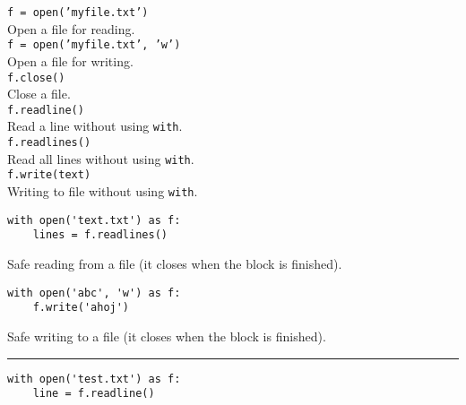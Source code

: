 \documentclass[12pt,a4paper]{article}
\begin{document}
\pagestyle{empty}

\setlength\parindent{0pt}
\setlength{\columnsep}{60pt}

\begin{multicols}{2}

\Large

\texttt{f = open('myfile.txt')}\\

Open a file for reading.\\

\texttt{f = open('myfile.txt', 'w')}\\

Open a file for writing.\\

\texttt{f.close()}\\

Close a file.\\

\texttt{f.readline()}\\

Read a line without using \texttt{with}.\\

\texttt{f.readlines()}\\

Read all lines without using \texttt{with}.\\

\texttt{f.write(text)}\\

Writing to file without using \texttt{with}.

\begin{verbatim}
with open('text.txt') as f:
    lines = f.readlines()
\end{verbatim}

Safe reading from a file (it closes when the block is finished).

\begin{verbatim}
with open('abc', 'w') as f:
    f.write('ahoj')
\end{verbatim}

Safe writing to a file (it closes when the block is finished).\\

\rule{\linewidth}{1pt}

\begin{verbatim}
with open('test.txt') as f:
    line = f.readline()
\end{verbatim}

\end{multicols}
\end{document}
